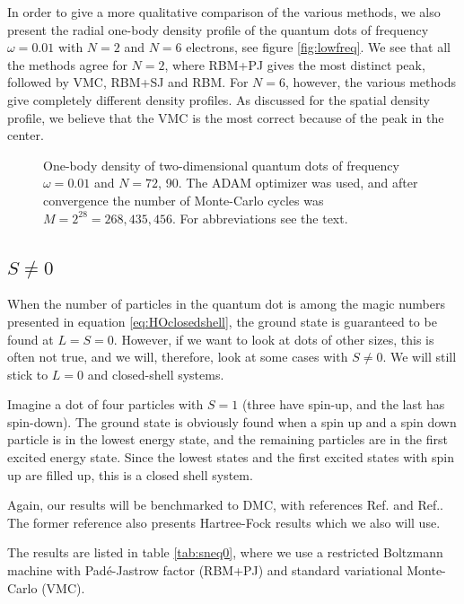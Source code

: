 In order to give a more qualitative comparison of the various methods, we also present the radial one-body density profile of the quantum dots of frequency $\omega=0.01$ with $N=2$ and $N=6$ electrons, see figure \eqref{fig:lowfreq}. We see that all the methods agree for $N=2$, where RBM+PJ gives the most distinct peak, followed by VMC, RBM+SJ and RBM. For $N=6$, however, the various methods give completely different density profiles. As discussed for the spatial density profile, we believe that the VMC is the most correct because of the peak in the center. 

\begin{figure}
	\centering
	\captionsetup[subfigure]{labelformat=empty}
	
	\caption{One-body density of two-dimensional quantum dots of frequency $\omega=0.01$ and $N=72$, 90. The ADAM optimizer was used, and after convergence the number of Monte-Carlo cycles was $M=2^{28}=268,435,456$. For abbreviations see the text.}
	\label{fig:lowfreq}
\end{figure}

\iffalse
\subsection{$S\neq0$}
When the number of particles in the quantum dot is among the magic numbers presented in equation \eqref{eq:HOclosedshell}, the ground state is guaranteed to be found at $L=S=0$. However, if we want to look at dots of other sizes, this is often not true, and we will, therefore, look at some cases with $S\neq 0$. We will still stick to $L=0$ and closed-shell systems.

Imagine a dot of four particles with $S=1$ (three have spin-up, and the last has spin-down). The ground state is obviously found when a spin up and a spin down particle is in the lowest energy state, and the remaining particles are in the first excited energy state. Since the lowest states and the first excited states with spin up are filled up, this is a closed shell system.

Again, our results will be benchmarked to DMC, with references Ref.\cite{pederiva_diffusion_2000} and Ref.\cite{ghosal_incipient_2007}. The former reference also presents Hartree-Fock results which we also will use. 

The results are listed in table \eqref{tab:sneq0}, where we use a restricted Boltzmann machine with Padé-Jastrow factor (RBM+PJ) and standard variational Monte-Carlo (VMC). 

